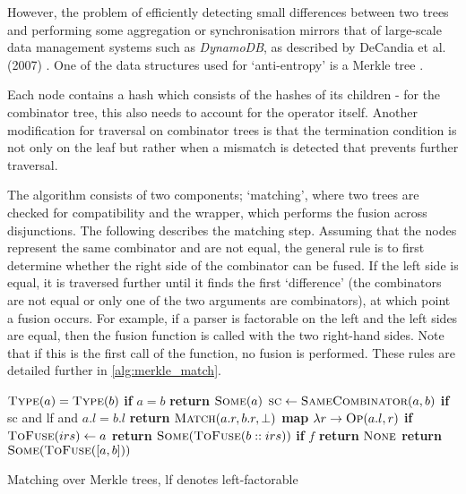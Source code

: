 However, the problem of efficiently detecting small differences between two trees and performing some aggregation or synchronisation mirrors that of large-scale data management systems such as \textit{DynamoDB}, as described by DeCandia et al. (2007) \cite{decandia07}.
One of the data structures used for `anti-entropy' is a Merkle tree \cite{merkle87}.

Each node contains a hash which consists of the hashes of its children - for the combinator tree, this also needs to account for the operator itself.
Another modification for traversal on combinator trees is that the termination condition is not only on the leaf but rather when a mismatch is detected that prevents further traversal.

The algorithm consists of two components; `matching', where two trees are checked for compatibility and the wrapper, which performs the fusion across disjunctions.
The following describes the matching step.
Assuming that the nodes represent the same combinator and are not equal, the general rule is to first determine whether the right side of the combinator can be fused.
If the left side is equal, it is traversed further until it finds the first `difference' (the combinators are not equal or only one of the two arguments are combinators), at which point a fusion occurs.
For example, if a parser is factorable on the left and the left sides are equal, then the fusion function is called with the two right-hand sides.
Note that if this is the first call of the function, no fusion is performed.
These rules are detailed further in \autoref{alg:merkle_match}.

\begin{algorithm}[H]
    \begin{algorithmic}[1]
        \Require $\text{\sc Type}(a) = \text{\sc Type}(b)$
         
            \State \textbf{if} $a = b$ \textbf{return} $\text{\sc Some}(a)$
            \State $\text{\sc sc} \gets \text{\sc SameCombinator}(a, b)$ 
            \State \textbf{if} {\sc sc} and {\sc lf} and $a.l = b.l$ \textbf{return} $\text{\sc Match}(a.r, b.r, \bot)$ \textbf{map} $\lambda r \to \text{\sc Op}(a.l, r)$
            \State \textbf{if} $\text{\sc ToFuse}(irs) \gets a$ \textbf{return} $\text{\sc Some}(\text{\sc ToFuse}(b :: irs))$
            \State \textbf{if} $f$ \textbf{return} $\text{\sc None}$
            \State \textbf{return} $\text{\sc Some}(\text{\sc ToFuse}([a, b]))$
        \EndFunction
    \end{algorithmic}
    \caption{Matching over Merkle trees, {\sc lf} denotes left-factorable}
    \label{alg:merkle_match}
\end{algorithm}

